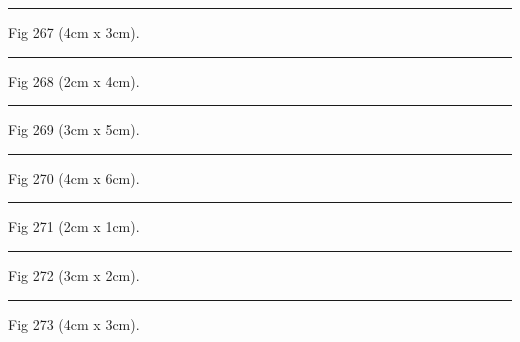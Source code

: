 \documentclass[a4paper,11pt]{article}
\begin{document}
\begin{swarmwrap}%
  \begin{minipage}[t]{4cm}
    \centering
    \rule{\linewidth}{3cm}
    {\footnotesize Fig 267 (4cm x 3cm).}
  \end{minipage}%
\end{swarmwrap}%
\swarmwrapnext
\lipsum[117]%

\begin{swarmwrap}%
  \begin{minipage}[t]{2cm}
    \centering
    \rule{\linewidth}{4cm}
    {\footnotesize Fig 268 (2cm x 4cm).}
  \end{minipage}%
\end{swarmwrap}%
\swarmwrapnext
\lipsum[118]%

\begin{swarmwrap}%
  \begin{minipage}[t]{3cm}
    \centering
    \rule{\linewidth}{5cm}
    {\footnotesize Fig 269 (3cm x 5cm).}
  \end{minipage}%
\end{swarmwrap}%
\swarmwrapnext
\lipsum[119]%

\begin{swarmwrap}%
  \begin{minipage}[t]{4cm}
    \centering
    \rule{\linewidth}{6cm}
    {\footnotesize Fig 270 (4cm x 6cm).}
  \end{minipage}%
\end{swarmwrap}%
\swarmwrapnext
\lipsum[120]%

\begin{swarmwrap}%
  \begin{minipage}[t]{2cm}
    \centering
    \rule{\linewidth}{1cm}
    {\footnotesize Fig 271 (2cm x 1cm).}
  \end{minipage}%
\end{swarmwrap}%
\swarmwrapnext
\lipsum[121]%

\begin{swarmwrap}%
  \begin{minipage}[t]{3cm}
    \centering
    \rule{\linewidth}{2cm}
    {\footnotesize Fig 272 (3cm x 2cm).}
  \end{minipage}%
\end{swarmwrap}%
\swarmwrapnext
\lipsum[122]%

\begin{swarmwrap}%
  \begin{minipage}[t]{4cm}
    \centering
    \rule{\linewidth}{3cm}
    {\footnotesize Fig 273 (4cm x 3cm).}
  \end{minipage}%
\end{swarmwrap}%
\swarmwrapnext
\lipsum[123]%
\end{document}
